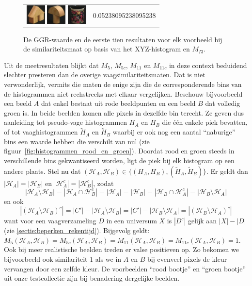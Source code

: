 \begin{figure}[tbp]
\begin{center}
\begin{tabular}{m{11cm} | m{3cm} |}
\includegraphics[width=1cm]{coil/beeld-45.eps}
\includegraphics[width=1cm]{coil/beeld-4.eps}
\includegraphics[width=1cm]{coil/beeld-62.eps}
& {\scriptsize 0.05238095238095238}
\\
\end{tabular}
\caption{\label{fig:results_xyz_histgeb}De GGR-waarde en de eerste tien resultaten voor elk voorbeeld bij de similariteitsmaat op basis van het XYZ-histogram en $M_{I3}$.}
\end{center}
\end{figure}

Uit de meetresultaten blijkt dat $M_5$, $M_{5c}$, $M_{11}$ en $M_{11c}$ in deze context
beduidend slechter presteren dan de overige vaagsimilariteitsmaten. Dat is niet
verwonderlijk, vermits die maten de enige zijn die de corresponderende bins van de histogrammen 
niet rechstreeks met elkaar vergelijken. Beschouw bijvoorbeeld een beeld $A$ dat enkel bestaat
uit rode beeldpunten en een beeld $B$ dat volledig groen is. In beide beelden komen alle
pixels in dezelfde bin terecht. Ze geven dus aanleiding tot pseudo-vage histogrammen $H_A$ en $H_B$  
die \'e\'en enkele piek bevatten, of tot vaaghistogrammen $\widetilde{H}_A$ en $\widetilde{H}_B$ 
waarbij er ook nog een aantal ``naburige'' bins een waarde hebben die verschilt van nul 
(zie figuur~\ref{fig:histogrammen_rood_en_groen}). Doordat rood en 
groen steeds in verschillende bins gekwantiseerd worden, ligt de piek bij elk histogram op een 
andere plaats. 
Stel nu dat $(\mathcal{H}_A,\mathcal{H}_B) \in \{(H_A,H_B), (\widetilde{H}_A,\widetilde{H}_B)\}$.
Er geldt dan
$|\mathcal{H}_A|=|\mathcal{H}_B|$ en $|\mathcal{H}_{A}^c|=|\mathcal{H}_{B}^c|$, zodat
$$
|\mathcal{H}_A \setminus \mathcal{H}_B|=|\mathcal{H}_A \cap \mathcal{H}_{B}^c|=|\mathcal{H}_A|=|\mathcal{H}_B|=|\mathcal{H}_B \cap \mathcal{H}_{A}^c|=|\mathcal{H}_B \setminus \mathcal{H}_A|
$$ 
en ook
$$
|(\mathcal{H}_A  \setminus \mathcal{H}_B)^c|=|C'|-|\mathcal{H}_A \setminus \mathcal{H}_B|=|C'|-|\mathcal{H}_B \setminus \mathcal{H}_A|=|(\mathcal{H}_B  \setminus \mathcal{H}_A)^c|
$$
want voor een vaagverzameling $D$ in een universum $X$ is $|D^c|$ gelijk aan $|X|-|D|$ (zie \ref{sectie:beperken_rekentijd}). Bijgevolg geldt:
$M_5(\mathcal{H}_A,\mathcal{H}_B)=M_{5c}(\mathcal{H}_A,\mathcal{H}_B)=M_{11}(\mathcal{H}_A,\mathcal{H}_B)=M_{11c}(\mathcal{H}_A,\mathcal{H}_B)=1$.
Ook bij meer realistische beelden treden er valse positieven op. Zo bekomen 
we bijvoorbeeld ook similariteit $1$ als we in $A$ en $B$ bij evenveel pixels de kleur vervangen door 
een zelfde kleur. De voorbeelden ``rood bootje'' en ``groen bootje'' uit onze testcollectie zijn bij 
benadering dergelijke beelden. 


